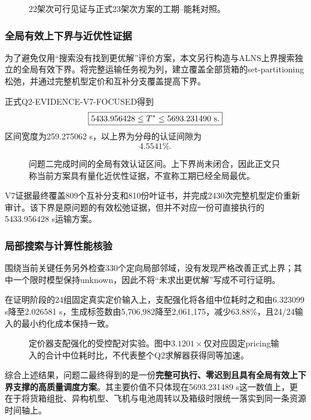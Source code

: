 \documentclass[UTF8,a4paper,12pt]{ctexart}
\begin{document}
\begin{figure}[H]
  \centering
  \resizebox{0.76\textwidth}{!}{\QTwoFigTwentyTwoTwentyThree}
  \caption{22架次可行见证与正式23架次方案的工期--能耗对照。}
  \label{fig:q2_22_23_v7}
\end{figure}

\subsubsection{全局有效上下界与近优性证据}

为了避免仅用“搜索没有找到更优解”评价方案，本文另行构造与ALNS上界搜索独立的全局有效下界。将完整运输任务视为列，建立覆盖全部货箱的set-partitioning松弛，并通过完整机型定价和互补分支覆盖提高下界。

正式Q2-EVIDENCE-V7-FOCUSED得到
\[
\boxed{
5433.956428\le T^*\le5693.231490\ {\rm s}.
}
\]
区间宽度为259.275062 s，以上界为分母的认证间隙为
\[
\boxed{
4.5541\%.
}
\]

\begin{figure}[H]
  \centering
  \resizebox{0.78\textwidth}{!}{\QTwoFigInterval}
  \caption{问题二完成时间的全局有效认证区间。上下界尚未闭合，因此正文只称当前方案具有量化近优性证据，不宣称工期已经全局最优。}
  \label{fig:q2_interval_v7}
\end{figure}

V7证据最终覆盖809个互补分支和810份叶证书，并完成2430次完整机型定价重新审计。该下界是原问题的有效松弛证据，但并不对应一份可直接执行的5433.956428 s运输方案。

\subsubsection{局部搜索与计算性能核验}

围绕当前关键任务另外检查330个定向局部邻域，没有发现严格改善正式上界；其中一个限时模型保持unknown，因此不将“未求出更优解”写成不可行证明。

在证明阶段的24组固定真实定价输入上，支配强化将各组中位耗时之和由6.323099 s降至2.026581 s，生成标签数由5,706,982降至2,061,175，减少63.88\%，且24/24输入的最小约化成本保持一致。

\begin{figure}[H]
  \centering
  \resizebox{0.76\textwidth}{!}{\QTwoFigPricing}
  \caption{定价器支配强化的受控配对实验。图中$3.1201\times$仅对应固定pricing输入的合计中位耗时比，不代表整个Q2求解器获得同等加速。}
  \label{fig:q2_pricing_v7}
\end{figure}

综合上述结果，问题二最终得到的是一份\textbf{完整可执行、零迟到且具有全局有效上下界支撑的高质量调度方案}。其主要价值不只体现在5693.231489 s这一数值上，更在于将货箱组批、异构机型、飞机与电池周转以及箱级时限统一落实到同一条资源时间轴上。
\end{document}
